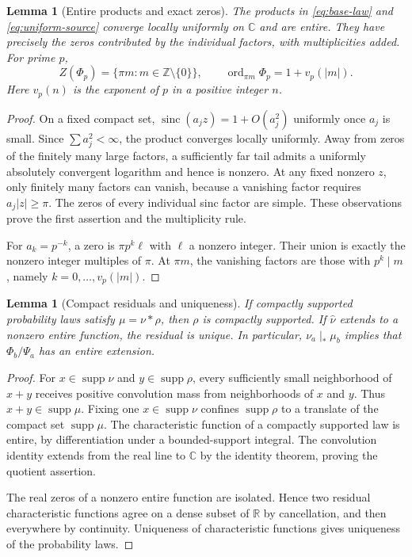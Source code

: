 \documentclass[11pt,a4paper]{article}
\newtheorem{lemma}[theorem]{Lemma}
\theoremstyle{remark}
\newcommand{\R}{\mathbb R}
\newcommand{\C}{\mathbb C}
\newcommand{\Z}{\mathbb Z}
\newcommand{\supp}{\operatorname{supp}}
\newcommand{\sinc}{\operatorname{sinc}}
\newcommand{\ord}{\operatorname{ord}}
\newcommand{\cf}[1]{\widehat{#1}}
\begin{document}
\begin{lemma}[Entire products and exact zeros]
\label{lem:zeros}
The products in \eqref{eq:base-law} and \eqref{eq:uniform-source} converge locally
uniformly on $\C$ and are entire. They have precisely the zeros contributed by
the individual factors, with multiplicities added. For prime $p$,
\begin{equation}
 Z(\Phi_p)=\{\pi m:m\in\Z\setminus\{0\}\},
 \qquad \ord_{\pi m}\Phi_p=1+v_p(|m|).
 \label{eq:target-zeros}
\end{equation}
Here $v_p(n)$ is the exponent of $p$ in a positive integer $n$.
\end{lemma}
\begin{proof}
On a fixed compact set, $\sinc(a_jz)=1+O(a_j^2)$ uniformly once $a_j$ is small.
Since $\sum a_j^2<\infty$, the product converges locally uniformly. Away from
zeros of the finitely many large factors, a sufficiently far tail admits a
uniformly absolutely convergent logarithm and hence is nonzero. At any fixed
nonzero $z$, only finitely many factors can vanish, because a vanishing factor
requires $a_j|z|\ge\pi$. The zeros of every individual sinc factor are simple.
These observations prove the first assertion and the multiplicity rule.

For $a_k=p^{-k}$, a zero is $\pi p^k\ell$ with $\ell$ a nonzero integer.
Their union is exactly the nonzero integer multiples of $\pi$. At $\pi m$,
the vanishing factors are those with $p^k\mid m$, namely
$k=0,\ldots,v_p(|m|)$.
\end{proof}

\begin{lemma}[Compact residuals and uniqueness]
\label{lem:residual}
If compactly supported probability laws satisfy $\mu=\nu*\rho$, then $\rho$ is
compactly supported. If $\cf\nu$ extends to a nonzero entire function, the
residual is unique. In particular, $\nu_a\mid_*\mu_b$ implies that
$\Phi_b/\Psi_a$ has an entire extension.
\end{lemma}
\begin{proof}
For $x\in\supp\nu$ and $y\in\supp\rho$, every sufficiently small neighborhood
of $x+y$ receives positive convolution mass from neighborhoods of $x$ and $y$.
Thus $x+y\in\supp\mu$. Fixing one $x\in\supp\nu$ confines $\supp\rho$ to a
translate of the compact set $\supp\mu$. The characteristic function of a
compactly supported law is entire, by differentiation under a bounded-support
integral. The convolution identity extends from the real line to $\C$ by the
identity theorem, proving the quotient assertion.

The real zeros of a nonzero entire function are isolated. Hence two residual
characteristic functions agree on a dense subset of $\R$ by cancellation, and
then everywhere by continuity. Uniqueness of characteristic functions gives
uniqueness of the probability laws.
\end{proof}
\end{document}
